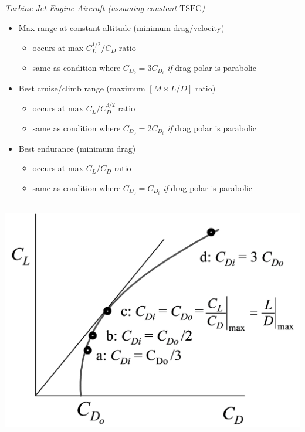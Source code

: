 \documentclass[
]{book}
\providecommand{\tightlist}{%
  \setlength{\itemsep}{0pt}\setlength{\parskip}{0pt}}
\begin{document}
\emph{Turbine Jet Engine Aircraft (assuming constant \(\mathrm{TSFC}\))}

\begin{itemize}
\tightlist
\item
  Max range at constant altitude (minimum drag/velocity)

  \begin{itemize}
  \tightlist
  \item
    occurs at max \(C_L^{1/2} / C_D\) ratio
  \item
    same as condition where \(C_{D_0} = 3C_{D_i}\) \emph{if} drag polar is parabolic
  \end{itemize}
\item
  Best cruise/climb range (maximum \(\left[M \times L/D \right]\) ratio)

  \begin{itemize}
  \tightlist
  \item
    occurs at max \(C_L/C_D^{3/2}\) ratio
  \item
    same as condition where \(C_{D_0} = 2C_{D_i}\) \emph{if} drag polar is parabolic
  \end{itemize}
\item
  Best endurance (minimum drag)

  \begin{itemize}
  \tightlist
  \item
    occurs at max \(C_L/C_D\) ratio
  \item
    same as condition where \(C_{D_0} = C_{D_i}\) \emph{if} drag polar is parabolic
  \end{itemize}
\end{itemize}

\includegraphics[width=5.75in,height=4.174in]{media/05/image97.svg}
\end{document}
